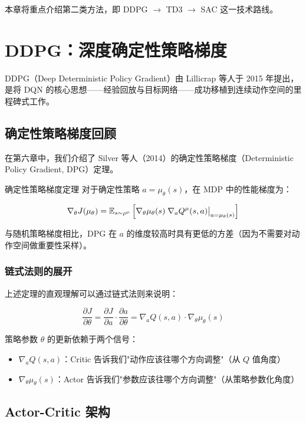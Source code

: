 本章将重点介绍第二类方法，即 DDPG $\to$ TD3 $\to$ SAC 这一技术路线。

\section{DDPG：深度确定性策略梯度}

DDPG（Deep Deterministic Policy Gradient）由 Lillicrap 等人于 2015 年提出，是将 DQN 的核心思想——经验回放与目标网络——成功移植到连续动作空间的里程碑式工作。

\subsection{确定性策略梯度回顾}

在第六章中，我们介绍了 Silver 等人（2014）的确定性策略梯度（Deterministic Policy Gradient, DPG）定理。

\begin{myTheorem}{确定性策略梯度定理}
对于确定性策略 $a = \mu_\theta(s)$，在 MDP 中的性能梯度为：

\[
\nabla_\theta J(\mu_\theta) = \mathbb{E}_{s \sim \rho^\mu}
\left[ \nabla_\theta \mu_\theta(s) \; \nabla_a Q^\mu(s, a) \big|_{a = \mu_\theta(s)} \right]
\]

与随机策略梯度相比，DPG 在 $a$ 的维度较高时具有更低的方差（因为不需要对动作空间做重要性采样）。
\end{myTheorem}

\subsubsection{链式法则的展开}

上述定理的直观理解可以通过链式法则来说明：

\[
\frac{\partial J}{\partial \theta} = \frac{\partial J}{\partial a} \cdot \frac{\partial a}{\partial \theta}
= \nabla_a Q(s, a) \cdot \nabla_\theta \mu_\theta(s)
\]

策略参数 $\theta$ 的更新依赖于两个信号：
\begin{itemize}
    \item $\nabla_a Q(s, a)$：Critic 告诉我们"动作应该往哪个方向调整"（从 $Q$ 值角度）
    \item $\nabla_\theta \mu_\theta(s)$：Actor 告诉我们"参数应该往哪个方向调整"（从策略参数化角度）
\end{itemize}

\subsection{Actor-Critic 架构}

